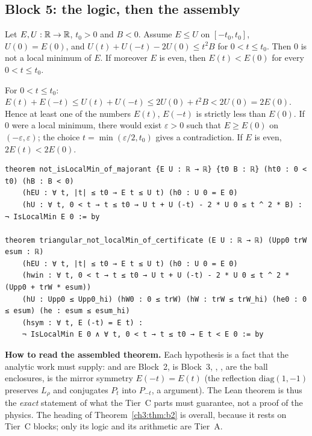 \subsection{Block 5: the logic, then the assembly}\label{ch3:sec:logique}
\begin{lemma}\label{ch3:lem:logique}
Let $E,U:\mathbb{R}\to\mathbb{R}$, $t_0>0$ and $B<0$. Assume $E\le U$ on $[-t_0,t_0]$, $U(0)=E(0)$, and
$U(t)+U(-t)-2U(0)\le t^2B$ for $0<t\le t_0$. Then $0$ is not a local minimum of $E$. If moreover $E$ is even,
then $E(t)<E(0)$ for every $0<t\le t_0$. \tierAs
\end{lemma}
\begin{humanproof}
For $0<t\le t_0$: $E(t)+E(-t)\le U(t)+U(-t)\le2U(0)+t^2B<2U(0)=2E(0)$. Hence at least one of the numbers $E(t)$,
$E(-t)$ is strictly less than $E(0)$. If $0$ were a local minimum, there would exist $\varepsilon>0$ such that
$E\ge E(0)$ on $(-\varepsilon,\varepsilon)$; the choice $t=\min(\varepsilon/2,t_0)$ gives a contradiction. If $E$ is
even, $2E(t)<2E(0)$.
\end{humanproof}
\begin{leanbox}
\begin{lstlisting}[style=chIIIlean]
theorem not_isLocalMin_of_majorant {E U : ℝ → ℝ} {t0 B : ℝ} (ht0 : 0 < t0) (hB : B < 0)
    (hEU : ∀ t, |t| ≤ t0 → E t ≤ U t) (h0 : U 0 = E 0)
    (hU : ∀ t, 0 < t → t ≤ t0 → U t + U (-t) - 2 * U 0 ≤ t ^ 2 * B) : ¬ IsLocalMin E 0 := by

theorem triangular_not_localMin_of_certificate (E U : ℝ → ℝ) (Upp0 trW esum : ℝ)
    (hEU : ∀ t, |t| ≤ t0 → E t ≤ U t) (h0 : U 0 = E 0)
    (hwin : ∀ t, 0 < t → t ≤ t0 → U t + U (-t) - 2 * U 0 ≤ t ^ 2 * (Upp0 + trW * esum))
    (hU : Upp0 ≤ Upp0_hi) (hW0 : 0 ≤ trW) (hW : trW ≤ trW_hi) (he0 : 0 ≤ esum) (he : esum ≤ esum_hi)
    (hsym : ∀ t, E (-t) = E t) :
    ¬ IsLocalMin E 0 ∧ ∀ t, 0 < t → t ≤ t0 → E t < E 0 := by
\end{lstlisting}
\end{leanbox}
\noindent \textbf{How to read the assembled theorem.} Each hypothesis is a fact that the analytic work must
supply:  and  are Block~2,  is Block~3, , ,  are the
ball enclosures,  is the mirror symmetry $E(-t)=E(t)$ (the reflection $\mathrm{diag}(1,-1)$ preserves
$L_\rho$ and conjugates $P_t$ into $P_{-t}$, a \tierC{} argument). The Lean theorem is thus the \emph{exact} statement of
what the Tier~C parts must guarantee, not a proof of the physics. The heading of Theorem~\ref{ch3:thm:b2} is \tierC{}
overall, because it rests on Tier~C blocks; only its logic and its arithmetic are Tier~A.

